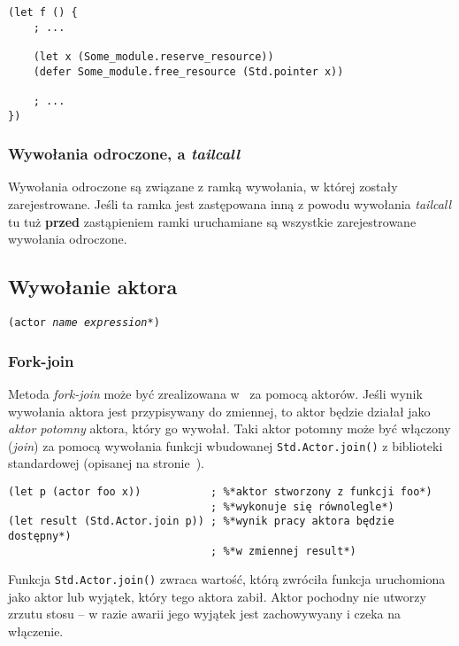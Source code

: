 \begin{lstlisting}
(let f () {
    ; ...

    (let x (Some_module.reserve_resource))
    (defer Some_module.free_resource (Std.pointer x))

    ; ...
})
\end{lstlisting}

\subsubsection{Wywołania odroczone, a \emph{tailcall}}

Wywołania odroczone są związane z ramką wywołania, w której zostały
zarejestrowane. Jeśli ta ramka jest zastępowana inną z powodu wywołania
\emph{tailcall} tu tuż \textbf{przed} zastąpieniem ramki uruchamiane są
wszystkie zarejestrowane wywołania odroczone.

\subsection{Wywołanie aktora}
\label{viuact_spec_actor_call}

\texttt{(actor \emph{name} \emph{expression}*)}

\subsubsection{Fork-join}

Metoda \emph{fork-join} może być zrealizowana w \ViuAct\ za pomocą aktorów.
Jeśli wynik wywołania aktora jest przypisywany do zmiennej, to aktor będzie
działał jako \emph{aktor potomny} aktora, który go wywołał. Taki aktor potomny
może być włączony (\emph{join}) za pomocą wywołania funkcji wbudowanej
\texttt{Std.Actor.join()} z biblioteki standardowej (opisanej na
stronie~\pageref{Std_Actor_join}).

\begin{lstlisting}
(let p (actor foo x))           ; %*aktor stworzony z funkcji foo*)
                                ; %*wykonuje się równolegle*)
(let result (Std.Actor.join p)) ; %*wynik pracy aktora będzie dostępny*)
                                ; %*w zmiennej result*)
\end{lstlisting}

Funkcja \texttt{Std.Actor.join()} zwraca wartość, którą zwróciła funkcja
uruchomiona jako aktor lub wyjątek, który tego aktora zabił. Aktor pochodny nie
utworzy zrzutu stosu -- w razie awarii jego wyjątek jest zachowywyany i czeka na
włączenie.

